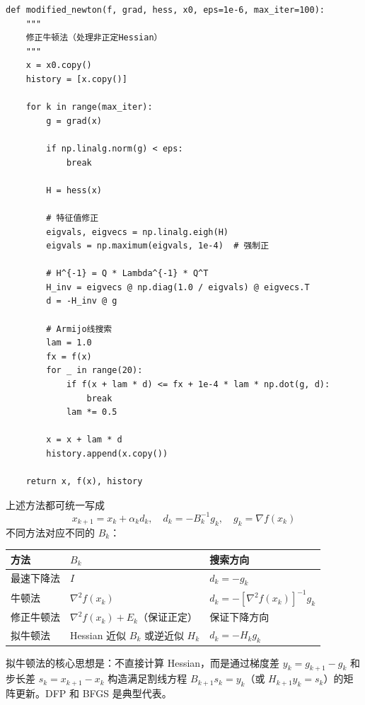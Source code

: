 \begin{codebox}[带Hessian修正的牛顿法]
\begin{lstlisting}
def modified_newton(f, grad, hess, x0, eps=1e-6, max_iter=100):
    """
    修正牛顿法（处理非正定Hessian）
    """
    x = x0.copy()
    history = [x.copy()]
    
    for k in range(max_iter):
        g = grad(x)
        
        if np.linalg.norm(g) < eps:
            break
        
        H = hess(x)
        
        # 特征值修正
        eigvals, eigvecs = np.linalg.eigh(H)
        eigvals = np.maximum(eigvals, 1e-4)  # 强制正
        
        # H^{-1} = Q * Lambda^{-1} * Q^T
        H_inv = eigvecs @ np.diag(1.0 / eigvals) @ eigvecs.T
        d = -H_inv @ g
        
        # Armijo线搜索
        lam = 1.0
        fx = f(x)
        for _ in range(20):
            if f(x + lam * d) <= fx + 1e-4 * lam * np.dot(g, d):
                break
            lam *= 0.5
        
        x = x + lam * d
        history.append(x.copy())
    
    return x, f(x), history
\end{lstlisting}
\end{codebox}

\begin{notebox}
上述方法都可统一写成
\[
x_{k+1} = x_k + \alpha_k d_k, \quad d_k = -B_k^{-1} g_k, \quad g_k = \nabla f(x_k)
\]
不同方法对应不同的 $B_k$：
\begin{center}
\begin{tabular}{@{}lll@{}}
\toprule
\textbf{方法} & $B_k$ & \textbf{搜索方向} \\
\midrule
最速下降法 & $I$ & $d_k = -g_k$ \\
牛顿法 & $\nabla^2 f(x_k)$ & $d_k = -[\nabla^2 f(x_k)]^{-1} g_k$ \\
修正牛顿法 & $\nabla^2 f(x_k) + E_k$（保证正定） & 保证下降方向 \\
拟牛顿法 & Hessian 近似 $B_k$ 或逆近似 $H_k$ & $d_k = -H_k g_k$ \\
\bottomrule
\end{tabular}
\end{center}
拟牛顿法的核心思想是：不直接计算 Hessian，而是通过梯度差 $y_k = g_{k+1} - g_k$ 和步长差 $s_k = x_{k+1} - x_k$ 构造满足割线方程 $B_{k+1} s_k = y_k$（或 $H_{k+1} y_k = s_k$）的矩阵更新。DFP 和 BFGS 是典型代表。
\end{notebox}


